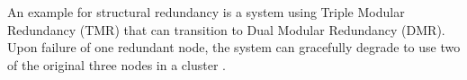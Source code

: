 An example for structural redundancy is a system using Triple Modular Redundancy (TMR) that can transition to Dual Modular Redundancy (DMR). Upon failure of one redundant node, the system can gracefully degrade to use two of the original three nodes in a cluster \parencite{djambazova_redundancy_2023}.

